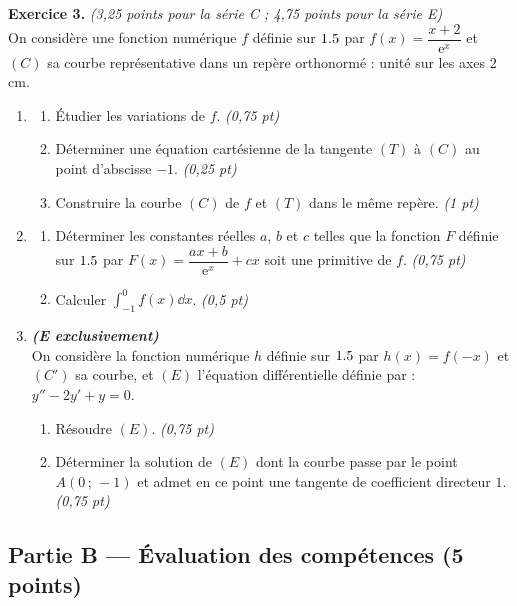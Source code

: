 \smallskip
\noindent\textbf{Exercice 3.} \hfill\textit{(3,25 points pour la série C ; 4,75 points pour la série E)}\\[2pt]
On considère une fonction numérique $f$ définie sur $1.5$ par $f(x)=\dfrac{x+2}{\mathrm e^{x}}$ et $(C)$ sa courbe représentative dans un repère orthonormé : unité sur les axes $2$\,cm.
\begin{enumerate}[label=\arabic*)]
\item \begin{enumerate}[label=\alph*)]
  \item Étudier les variations de $f$. \hfill\textit{(0,75 pt)}
  \item Déterminer une équation cartésienne de la tangente $(T)$ à $(C)$ au point d'abscisse $-1$. \hfill\textit{(0,25 pt)}
  \item Construire la courbe $(C)$ de $f$ et $(T)$ dans le même repère. \hfill\textit{(1 pt)}
  \end{enumerate}
\item \begin{enumerate}[label=\alph*)]
  \item Déterminer les constantes réelles $a$, $b$ et $c$ telles que la fonction $F$ définie sur $1.5$ par $F(x)=\dfrac{ax+b}{\mathrm e^{x}}+cx$ soit une primitive de $f$. \hfill\textit{(0,75 pt)}
  \item Calculer $\displaystyle\int_{-1}^{0}f(x)\dd x$. \hfill\textit{(0,5 pt)}
  \end{enumerate}
\item \textbf{\textit{(E exclusivement)}}\\
On considère la fonction numérique $h$ définie sur $1.5$ par $h(x)=f(-x)$ et $(C')$ sa courbe, et $(E)$ l'équation différentielle définie par : $y''-2y'+y=0$.
  \begin{enumerate}[label=\alph*)]
  \item Résoudre $(E)$. \hfill\textit{(0,75 pt)}
  \item Déterminer la solution de $(E)$ dont la courbe passe par le point $A(0\,;\,-1)$ et admet en ce point une tangente de coefficient directeur $1$. \hfill\textit{(0,75 pt)}
  \end{enumerate}
\end{enumerate}

\subsection*{Partie B — Évaluation des compétences \hfill (5 points)}

